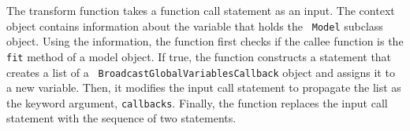 The transform function takes a function call statement as an input.
The context object contains information about the variable that holds the {\tt
Model} subclass object.
Using the information, the function first checks if the callee function is the
{\tt fit} method of a model object.
If true, the function constructs a statement that creates a list of a {\tt
BroadcastGlobalVariablesCallback} object and assigns it to a new variable.
Then, it modifies the input call statement to propagate the list as the keyword
argument, {\tt callbacks}.
Finally, the function replaces the input call statement with the sequence of
two statements.

% 
